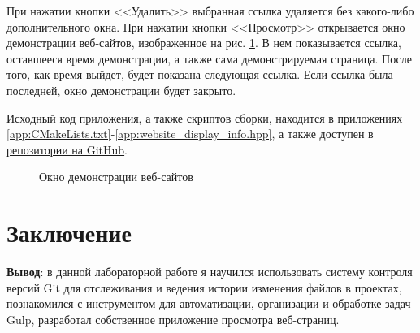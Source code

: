 \documentclass[a4paper, 14pt]{extarticle}
\begin{document}
При нажатии кнопки <<Удалить>> выбранная ссылка удаляется без какого-либо
дополнительного окна. При нажатии кнопки <<Просмотр>> открывается окно
демонстрации веб-сайтов, изображенное на рис. \ref{fig:viewer-window}. В нем
показывается ссылка, оставшееся время демонстрации, а также сама демонстрируемая
страница. После того, как время выйдет, будет показана следующая ссылка. Если
ссылка была последней, окно демонстрации будет закрыто.

Исходный код приложения, а также скриптов сборки, находится в приложениях
\ref{app:CMakeLists.txt}-\ref{app:website_display_info.hpp}, а также доступен в
\href{https://github.com/danilshvalov/itmo-web-programming}{репозитории на
  GitHub}.

\begin{figure}[H]
  \centering
  \caption{Окно демонстрации веб-сайтов}
  \label{fig:viewer-window}
\end{figure}

\section{Заключение}

\textbf{Вывод}: в данной лабораторной работе я научился использовать систему
контроля версий Git для отслеживания и ведения истории изменения файлов в
проектах, познакомился с инструментом для автоматизации, организации и обработке
задач Gulp, разработал собственное приложение просмотра веб-страниц.
\end{document}
